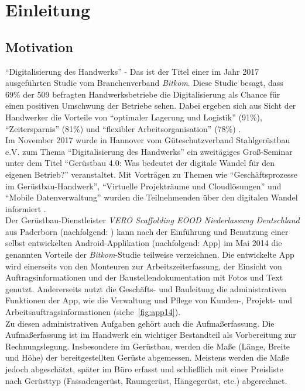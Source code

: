 \chapter{Einleitung}
\section{Motivation}\label{subsec:motivation}
``Digitalisierung des Handwerks'' - Das ist der Titel einer im Jahr 2017 ausgeführten Studie vom Branchenverband \textit{Bitkom}. 
Diese Studie besagt, dass 69\% der 509 befragten Handwerksbetriebe die Digitalisierung als Chance für einen positiven Umschwung der Betriebe sehen. 
Dabei ergeben sich aus Sicht der Handwerker die Vorteile von ``optimaler Lagerung und Logistik'' (91\%), ``Zeitersparnis'' (81\%) und ``flexibler Arbeitsorganisation'' (78\%) \citep{Bitkom17}. \\

Im November 2017 wurde in Hannover vom Güteschutzverband Stahlgerüstbau e.V. zum Thema ``Digitalisierung des Handwerks'' ein zweitägiges Groß-Seminar unter dem Titel ``Gerüstbau 4.0: Was bedeutet der digitale Wandel für den eigenen Betrieb?'' veranstaltet. 
Mit Vorträgen zu Themen wie ``Geschäftsprozesse im Gerüstbau-Handwerk'', ``Virtuelle Projekträume und Cloudlösungen'' und ``Mobile Datenverwaltung'' wurden die Teilnehmenden über den digitalen Wandel informiert \citep{GSV17}. \\

Der Gerüstbau-Dienstleister \emph{VERO Scaffolding EOOD Niederlassung Deutschland} aus Paderborn (nachfolgend: \vr{}) kann nach der Einführung und Benutzung einer selbst entwickelten Android-Applikation (nachfolgend: App) im Mai 2014 die genannten Vorteile der \textit{Bitkom}-Studie teilweise verzeichnen.
Die entwickelte App wird einerseits von den Monteuren zur Arbeitszeiterfassung, der Einsicht von Auftragsinformationen und der Baustellendokumentation mit Fotos und Text genutzt.
Andererseits nutzt die Geschäfts- und Bauleitung die administrativen Funktionen der App, wie die Verwaltung und Pflege von Kunden-, Projekt- und Arbeitsauftragsinformationen (siehe~\autoref{fig:app14}). \\

Zu diesen administrativen Aufgaben gehört auch die Aufmaßerfassung.
Die Aufmaßerfassung ist im Handwerk ein wichtiger Bestandteil als Vorbereitung zur Rechnungslegung.
Insbesondere im Gerüstbau, werden die Maße (Länge, Breite und Höhe) der bereitgestellten Gerüste abgemessen.
Meistens werden die Maße jedoch abgeschätzt, später im Büro erfasst und schließlich mit einer Preisliste nach Gerüsttyp (Fassadengerüst, Raumgerüst, Hängegerüst, etc.) abgerechnet.

